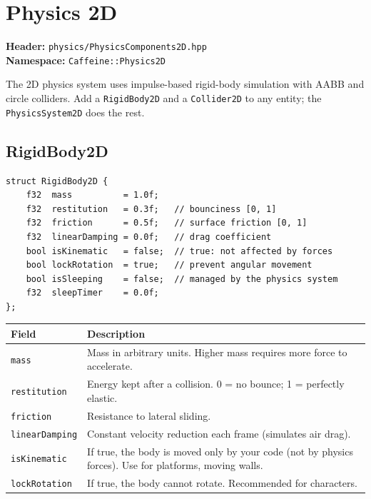\chapter{Physics 2D}
\label{chap:physics2d}

\textbf{Header:} \texttt{physics/PhysicsComponents2D.hpp}\\
\textbf{Namespace:} \texttt{Caffeine::Physics2D}

The 2D physics system uses impulse-based rigid-body simulation with AABB and
circle colliders. Add a \texttt{RigidBody2D} and a \texttt{Collider2D} to
any entity; the \texttt{PhysicsSystem2D} does the rest.

\section{RigidBody2D}

\begin{lstlisting}
struct RigidBody2D {
    f32  mass          = 1.0f;
    f32  restitution   = 0.3f;   // bounciness [0, 1]
    f32  friction      = 0.5f;   // surface friction [0, 1]
    f32  linearDamping = 0.0f;   // drag coefficient
    bool isKinematic   = false;  // true: not affected by forces
    bool lockRotation  = true;   // prevent angular movement
    bool isSleeping    = false;  // managed by the physics system
    f32  sleepTimer    = 0.0f;
};
\end{lstlisting}

\begin{longtable}{lp{9cm}}
\toprule
\textbf{Field} & \textbf{Description} \\
\midrule
\texttt{mass}          & Mass in arbitrary units. Higher mass requires more force to accelerate. \\
\texttt{restitution}   & Energy kept after a collision. 0 = no bounce; 1 = perfectly elastic. \\
\texttt{friction}      & Resistance to lateral sliding. \\
\texttt{linearDamping} & Constant velocity reduction each frame (simulates air drag). \\
\texttt{isKinematic}   & If true, the body is moved only by your code (not by physics forces). Use for platforms, moving walls. \\
\texttt{lockRotation}  & If true, the body cannot rotate. Recommended for characters. \\
\bottomrule
\end{longtable}

